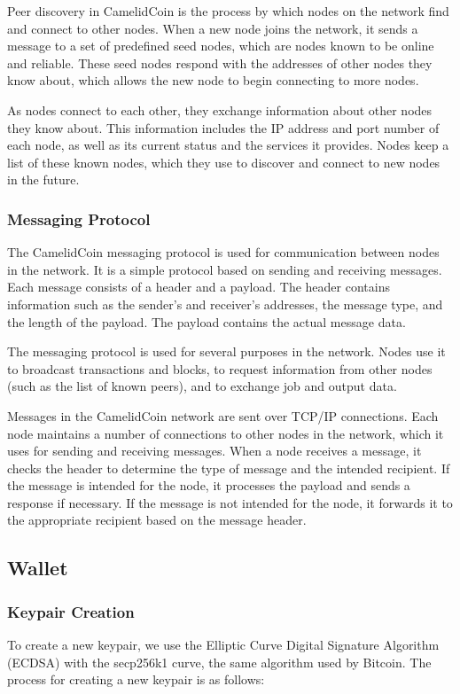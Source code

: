 \documentclass{article}
\begin{document}
Peer discovery in CamelidCoin is the process by which nodes on the network find and connect to other nodes. 
When a new node joins the network, it sends a message to a set of predefined seed nodes, which are nodes known to be online and reliable. 
These seed nodes respond with the addresses of other nodes they know about, which allows the new node to begin connecting to more nodes.

As nodes connect to each other, they exchange information about other nodes they know about. 
This information includes the IP address and port number of each node, as well as its current status and the services it provides.
Nodes keep a list of these known nodes, which they use to discover and connect to new nodes in the future.

\subsubsection{Messaging Protocol}

The CamelidCoin messaging protocol is used for communication between nodes in the network.
It is a simple protocol based on sending and receiving messages.
Each message consists of a header and a payload.
The header contains information such as the sender's and receiver's addresses, the message type, and the length of the payload.
The payload contains the actual message data.

The messaging protocol is used for several purposes in the network.
Nodes use it to broadcast transactions and blocks, to request information from other nodes (such as the list of known peers), and to exchange job and output data.

Messages in the CamelidCoin network are sent over TCP/IP connections.
Each node maintains a number of connections to other nodes in the network, which it uses for sending and receiving messages.
When a node receives a message, it checks the header to determine the type of message and the intended recipient.
If the message is intended for the node, it processes the payload and sends a response if necessary.
If the message is not intended for the node, it forwards it to the appropriate recipient based on the message header.
\subsection{Wallet}
\subsubsection{Keypair Creation}
To create a new keypair, we use the Elliptic Curve Digital Signature Algorithm (ECDSA) with the secp256k1 curve, the same algorithm used by Bitcoin. The process for creating a new keypair is as follows:
\end{document}
